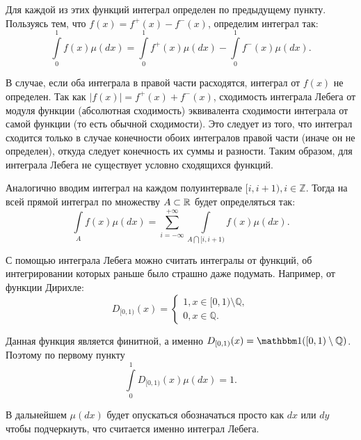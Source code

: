 \documentclass[../TV&MS.tex]{subfiles}
\begin{document}
\begin{itemize}
	Для каждой из этих функций интеграл определен по предыдущему пункту. 
	Пользуясь тем, что $f(x) = f^+(x) - f^-(x)$, определим интеграл так:
	$$  
		\int\limits_0^1 f(x) \mu(dx) =  \int\limits_0^1 f^+(x) \mu(dx) - 
		\int\limits_0^1 f^-(x) \mu(dx). 
	$$

	В случае, если оба интеграла в правой части расходятся, интеграл от $f(x)$ не 
	определен. Так как $|f(x)| = f^+(x) + f^-(x)$, сходимость интеграла Лебега от 
	модуля функции (абсолютная сходимость) эквивалента сходимости интеграла от самой 
	функции (то есть обычной сходимости). Это следует из того, что интеграл сходится 
	только в случае конечности обоих интегралов правой части (иначе он не определен), 
	откуда следует конечность их суммы и разности. Таким образом, для интеграла 
	Лебега не существует условно сходящихся функций.
\end{itemize}

Аналогично вводим интеграл на каждом полуинтервале $[i, i+1), i \in \mathbb{Z}$. 
Тогда на всей прямой интеграл по множеству $A \subset \mathbb{R}$ будет определяться так:
$$ 
	\int\limits_A f(x) \mu(dx) = \sum\limits_{i=-\infty}^{+\infty} 
	\int\limits_{A \bigcap [i, i+1)} f(x) \mu(dx). 
$$
	
\begin{Ex}
	С помощью интеграла Лебега можно считать интегралы от функций, об интегрировании 
	которых раньше было страшно даже подумать. Например, от функции Дирихле:
  	\[
  		D_{[0,1)}(x) = 
  		\begin{cases}
  			1, x \in [0,1) \setminus \mathbb{Q}, \\
  			0, x \in \mathbb{Q}.
  		\end{cases}
  	\]
  	
	Данная функция является финитной, а именно $D_{[0,1)}(x) = \Ind([0,1) 
	\setminus \mathbb{Q})$. Поэтому по первому пункту
 	$$ 
 		\int\limits_0^1 D_{[0,1)}(x) \mu(dx) = 1. 
 	$$
\end{Ex}

В дальнейшем $\mu(dx)$ будет опускаться обозначаться просто как $dx$ или 
$dy$ чтобы подчеркнуть, что считается именно интеграл Лебега.

\newpage
\end{document}
